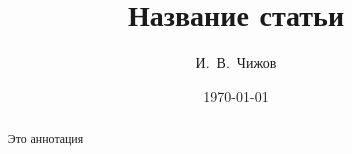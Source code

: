 
\title{Название статьи}

\author{И.~В.~Чижов}

\date{\today}

\maketitle

\begin{abstract}
    Это аннотация
\end{abstract}